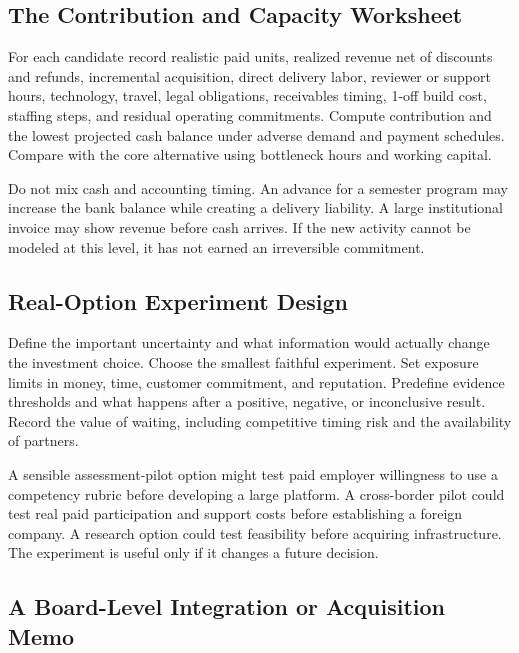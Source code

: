\subsection{The Contribution and Capacity Worksheet}
\label{sec:contribution_and_capacity_worksheet}

For each candidate record realistic paid units, realized revenue net of discounts and refunds, incremental acquisition, direct delivery labor, reviewer or support hours, technology, travel, legal obligations, receivables timing, 1-off build cost, staffing steps, and residual operating commitments. Compute contribution and the lowest projected cash balance under adverse demand and payment schedules. Compare with the core alternative using bottleneck hours and working capital.

Do not mix cash and accounting timing. An advance for a semester program may increase the bank balance while creating a delivery liability. A large institutional invoice may show revenue before cash arrives. If the new activity cannot be modeled at this level, it has not earned an irreversible commitment.

\subsection{Real-Option Experiment Design}
\label{sec:real_option_experiment_design}

Define the important uncertainty and what information would actually change the investment choice. Choose the smallest faithful experiment. Set exposure limits in money, time, customer commitment, and reputation. Predefine evidence thresholds and what happens after a positive, negative, or inconclusive result. Record the value of waiting, including competitive timing risk and the availability of partners.

A sensible assessment-pilot option might test paid employer willingness to use a competency rubric before developing a large platform. A cross-border pilot could test real paid participation and support costs before establishing a foreign company. A research option could test feasibility before acquiring infrastructure. The experiment is useful only if it changes a future decision.

\subsection{A Board-Level Integration or Acquisition Memo}
\label{sec:board_level_acquisition_memo}

